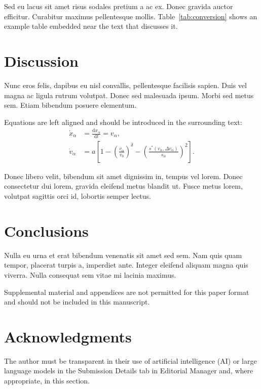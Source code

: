 \documentclass[10pt,numbered]{trbunofficial}
\begin{document}
Sed eu lacus sit amet risus sodales pretium a ac ex. Donec gravida auctor
efficitur. Curabitur maximus pellentesque mollis. Table~\ref{tab:conversion}
shows an example table embedded near the text that discusses it.

\section{Discussion}
Nunc eros felis, dapibus eu nisl convallis, pellentesque facilisis sapien.
Duis vel magna ac ligula rutrum volutpat. Donec sed malesuada ipsum. Morbi sed
metus sem. Etiam bibendum posuere elementum.

Equations are left aligned and should be introduced in the surrounding text:
\begin{align}
  \dot{x}_\alpha &= \frac{\mathrm{d}x_\alpha}{\mathrm{d}t} = v_\alpha,\\
  \dot{v}_\alpha &= a\!\left[
    1 - \left(\frac{v_\alpha}{v_0}\right)^\delta
    - \left(\frac{s^*(v_\alpha,\Delta v_\alpha)}{s_\alpha}\right)^2
  \right].
\end{align}

Donec libero velit, bibendum sit amet dignissim in, tempus vel lorem. Donec
consectetur dui lorem, gravida eleifend metus blandit ut. Fusce metus lorem,
volutpat sagittis orci id, lobortis semper lectus.

\section{Conclusions}
Nulla eu urna et erat bibendum venenatis sit amet sed sem. Nam quis quam
tempor, placerat turpis a, imperdiet ante. Integer eleifend aliquam magna quis
viverra. Nulla consequat sem vitae mi lacinia maximus.

Supplemental material and appendices are not permitted for this paper format
and should not be included in this manuscript.

\section{Acknowledgments}
The author must be transparent in their use of artificial intelligence (AI) or
large language models in the Submission Details tab in Editorial Manager and,
where appropriate, in this section.

\end{document}
